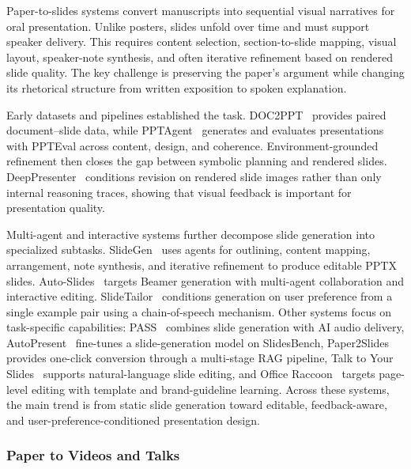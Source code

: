 Paper-to-slides systems convert manuscripts into sequential visual narratives for oral presentation. Unlike posters, slides unfold over time and must support speaker delivery. This requires content selection, section-to-slide mapping, visual layout, speaker-note synthesis, and often iterative refinement based on rendered slide quality. The key challenge is preserving the paper's argument while changing its rhetorical structure from written exposition to spoken explanation.

Early datasets and pipelines established the task. DOC2PPT~\cite{doc2ppt2022} provides paired document--slide data, while PPTAgent~\cite{pptagent2025} generates and evaluates presentations with PPTEval across content, design, and coherence. Environment-grounded refinement then closes the gap between symbolic planning and rendered slides. DeepPresenter~\cite{deeppresenter2026} conditions revision on rendered slide images rather than only internal reasoning traces, showing that visual feedback is important for presentation quality.

Multi-agent and interactive systems further decompose slide generation into specialized subtasks. SlideGen~\cite{slidegen2025} uses agents for outlining, content mapping, arrangement, note synthesis, and iterative refinement to produce editable PPTX slides. Auto-Slides~\cite{autoslides2025} targets Beamer generation with multi-agent collaboration and interactive editing. SlideTailor~\cite{slidetailor2025} conditions generation on user preference from a single example pair using a chain-of-speech mechanism. Other systems focus on task-specific capabilities: PASS~\cite{pass2025} combines slide generation with AI audio delivery, AutoPresent~\cite{autopresent2025} fine-tunes a slide-generation model on SlidesBench, Paper2Slides~\cite{paper2slides2025} provides one-click conversion through a multi-stage RAG pipeline, Talk to Your Slides~\cite{talkslides2025} supports natural-language slide editing, and Office Raccoon~\cite{sensetime2026} targets page-level editing with template and brand-guideline learning. Across these systems, the main trend is from static slide generation toward editable, feedback-aware, and user-preference-conditioned presentation design.



\subsubsection{Paper to Videos and Talks}
\label{sec:paper2video}

